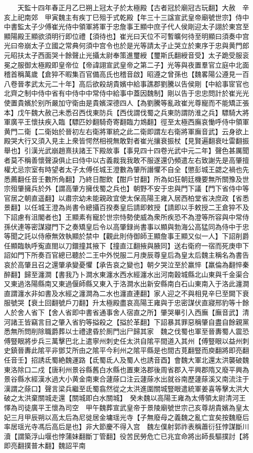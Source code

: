 　　天監十四年春正月乙巳朔上冠太子於太極殿【古者冠於廟冠古玩翻】大赦　辛亥上祀南郊　甲寅魏主有疾丁巳殂于式乾殿【年三十三諡宣武皇帝廟號世宗】侍中中書監太子少傅崔光侍中領軍將軍于忠詹事王顯中庶子代人侯剛迎太子詡於東宫至顯陽殿王顯欲須明行即位禮【須待也】崔光曰天位不可暫曠何待至明顯曰須奏中宫光曰帝崩太子立國之常典何須中宫令也於是光等請太子止哭立於東序于忠與黄門郎元昭扶太子西面哭十餘聲止光攝太尉奉策進璽綬【璽斯氏翻綬音受】太子跪受服衮冕之服御太極殿即皇帝位【帝諱詡宣武皇帝之第二子】光等與夜置羣官立庭中北面稽首稱萬歲【倉猝不暇集百官備高氏也稽音啟】昭遵之曾孫也【魏畧陽公遵見一百八卷晉孝武太元二十年】高后欲殺胡貴嬪中給事譙郡劉騰以告侯剛【中給事宧官也北齊之制中侍中省有中侍中中常侍中給事中蓋因魏制】剛以告于忠忠問計於崔光光使置貴嬪於别所嚴加守衛由是貴嬪深德四人【為劉騰等亂政崔光尊寵而不能矯正張本】戊午魏大赦己未悉召西伐東防兵【西伐謂伐蜀之兵東防謂防淮之兵】驃騎大將軍廣平王懷扶疾入臨【驃匹妙翻騎奇寄翻臨力鴆翻】徑至太極西廡哀慟呼侍中領軍黄門二衛【二衛始於晉初左右衛將軍統之此二衛即謂左右衛將軍廡音武】云身欲上殿哭大行又須入見主上衆皆愕然相視無敢對者崔光攘衰振杖【見賢遍翻衰吐雷翻振舉也】引漢光武崩趙熹扶諸王下殿故事【事見四十四卷光武中元二年】聲色甚厲聞者莫不稱善懷聲淚俱止曰侍中以古義裁我我敢不服遂還仍頻遣左右致謝先是高肇擅權尤忌宗室有時望者太子太傅任城王澄數為肇所譖懼不自全【懲彭城王勰之禍也先悉薦翻任音壬數所角翻】乃終日酣飲【酣戶甘翻】所為如狂朝廷機要無所關豫及世宗殂肇擁兵於外【謂高肇方擁伐蜀之兵也】朝野不安于忠與門下議【門下省侍中等官居之朝直遥翻】以肅宗幼未能親政宜使太保高陽王雍入居西柏堂省决庶政【省悉景翻】以任城王澄為尚書令總攝百揆奏皇后請即敕授【請即以手敕授二王倉猝不及下詔慮有沮閣者也】王顯素有寵於世宗恃勢使威為衆所疾恐不為澄等所容與中常侍孫伏連等密謀寢門下之奏矯皇后令以高肇録尚書事以顯與勃海公高猛同為侍中于忠等聞之託以侍療無效執顯於禁中【觀此則侍御師王顯詹事王顯又似一人】下詔削爵任顯臨執呼寃直閤以刀鐶撞其掖下【撞直江翻掖與腋同】送右衛府一宿而死庚申下詔如門下所奏百官總已聽於二王中外悦服二月庚辰尊皇后為皇太后魏主稱名為書告哀於高肇且召之還肇承變憂懼【承告哀之變也】朝夕哭泣至於羸悴【羸倫為翻悴秦醉翻】歸至瀍澗【書我乃卜澗水東瀍水西水經瀍水出河南穀城縣北山東與千金渠合又東過洛陽縣南又東過偃師縣又東入于洛澗水出新安縣南白石山東南入于洛此瀍澗直謂瀍水非如書及水經之瀍澗為二水也瀍直連翻】家人迎之不與相見辛巳至闕下衰服號哭【衰土回翻號戶刀翻】升太極殿盡哀高陽王雍與于忠密謀伏直寢邢豹等十餘人於舍人省下【舍人省即中書省通事舍人宿直之所】肇哭畢引入西廡【廡音武】清河諸王皆竊言目之肇入省豹等搤殺之【搤於革翻】下詔暴其罪惡稱肇自盡自餘親黨悉無所問削除職爵葬以士禮逮昏於厠門出尸歸其家　魏之伐蜀也軍至晉夀蜀人震恐傅豎眼將步兵三萬擊巴北上遣寧州刺史任太洪自隂平間道入其州【傅豎眼以益州刺史鎮晉夀此隂平非鄧艾所由之隂平今利州之隂平縣是也間古莧翻豎而庾翻將即亮翻任音壬】招誘氐蜀絶魏運路【氐蜀氐人及蜀人也誘音酉】會魏大軍北還太洪襲破魏東洛除口二戍【唐利州景谷縣舊白水縣也置東洛郡後周省郡入平興郡隋又廢平興為景谷縣水經漢水過大小黄金南東合蘧蒢口注云蘧蒢水出就谷南歷蘧蒢溪又南流注于漢謂之蒢口】聲言梁兵繼至氐蜀翕然從之太洪進圍關城豎眼遣統軍姜喜等擊太洪大破之太洪棄關城走還【關城即白水關城】　癸未魏以高陽王雍為太傅領太尉清河王懌為司徒廣平王懷為司空　甲午魏葬宣武皇帝于景陵廟號世宗己亥尊胡貴嬪為皇太妃三月甲辰朔以高太后為尼徙居金墉瑶光寺【子無廢母之義魏之亂亡宜矣按魏廢后率居瑶光寺馮后高后是也】非大節慶不得入宫　魏左僕射郭祚表稱蕭衍狂悖謀斷川瀆【謂築浮山堰也悖蒲妹翻斷丁管翻】役苦民勞危亡已兆宜命將出師長驅撲討【將即亮翻撲普木翻】魏詔平南